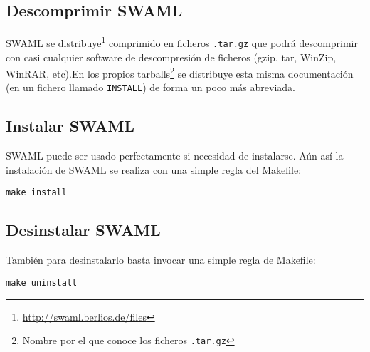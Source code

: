 \subsection*{Descomprimir SWAML}

SWAML se distribuye\footnote{\url{http://swaml.berlios.de/files}} comprimido
en ficheros \texttt{.tar.gz}  que podrá descomprimir con casi cualquier 
software de descompresión de ficheros (gzip, tar, WinZip, WinRAR, etc).En 
los propios tarballs\footnote{Nombre por el que conoce los ficheros \texttt{.tar.gz}}
se distribuye esta misma documentación (en un fichero llamado \texttt{INSTALL})
de forma un poco más abreviada.

\subsection*{Instalar SWAML}

SWAML puede ser usado perfectamente si necesidad de instalarse. Aún así la instalación 
de SWAML se realiza con una simple regla del Makefile:

\begin{center}
	\texttt{make install}
\end{center}

\subsection*{Desinstalar SWAML}

También para desinstalarlo basta invocar una simple regla de Makefile:

\begin{center}
	\texttt{make uninstall}
\end{center}

